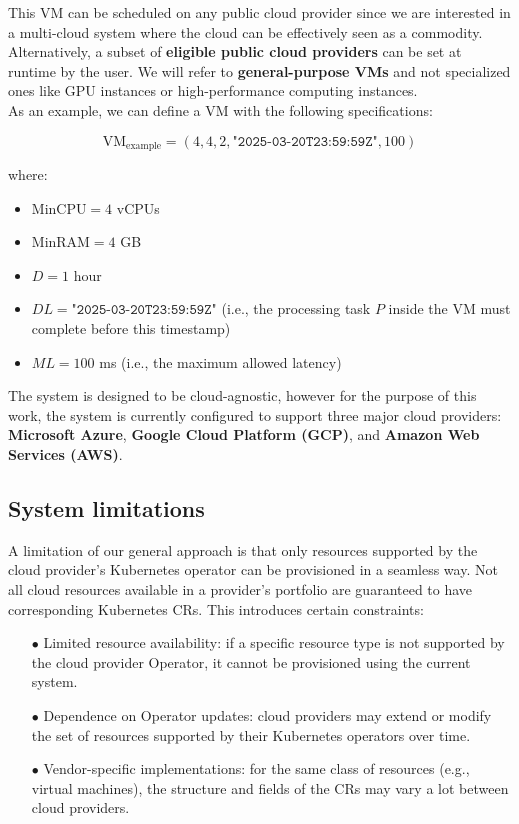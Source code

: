 This VM can be scheduled on any public cloud provider since we are interested in a multi-cloud system where the cloud can be effectively seen as a commodity. 
Alternatively, a subset of \textbf{eligible public cloud providers} can be set at runtime by the user.
We will refer to \textbf{general-purpose VMs} and not specialized ones like GPU instances or high-performance computing instances. \\

As an example, we can define a VM with the following specifications:

\[
\text{VM}_{\text{example}} = (4, 4, 2, \texttt{"2025-03-20T23:59:59Z"}, 100)
\]


where:
\begin{itemize}[itemsep=0.2pt, topsep=1pt]
    \item \( \text{MinCPU} = 4 \) vCPUs
    \item \( \text{MinRAM} = 4 \) GB
    \item \( D = 1 \) hour
    \item \( DL = \texttt{"2025-03-20T23:59:59Z"} \) (i.e., the processing task \( P \) inside the VM must complete before this timestamp)
    \item \( ML = 100 \) ms (i.e., the maximum allowed latency) \\
\end{itemize}

The system is designed to be cloud-agnostic, however for the purpose of this work, the system is currently configured to support three major cloud providers: \textbf{Microsoft Azure}, \textbf{Google Cloud Platform (GCP)}, and \textbf{Amazon Web Services (AWS)}.

\subsection{System limitations}

A limitation of our general approach is that only resources supported by the cloud provider’s Kubernetes operator can be provisioned in a 
seamless way.
Not all cloud resources available in a provider’s portfolio are guaranteed to have corresponding Kubernetes CRs. 
This introduces certain constraints:

\begin{itemize}[itemsep=0.2pt, topsep=1pt]
  \item[$\bullet$] Limited resource availability: if a specific resource type is not supported by the cloud provider Operator, it cannot be provisioned using the current system.
  \item[$\bullet$] Dependence on Operator updates: cloud providers may extend or modify the set of resources supported by their Kubernetes operators over time.
  \item[$\bullet$] Vendor-specific implementations: for the same class of resources (e.g., virtual machines), the structure and fields of the CRs may vary a lot between cloud providers.
\end{itemize}

